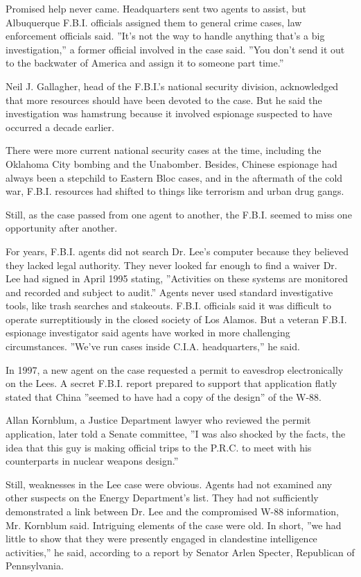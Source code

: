 Promised help never came. Headquarters sent two agents to assist, but
Albuquerque F.B.I. officials assigned them to general crime cases, law
enforcement officials said. ''It's not the way to handle anything that's
a big investigation,'' a former official involved in the case said.
''You don't send it out to the backwater of America and assign it to
someone part time.''

Neil J. Gallagher, head of the F.B.I.'s national security division,
acknowledged that more resources should have been devoted to the case.
But he said the investigation was hamstrung because it involved
espionage suspected to have occurred a decade earlier.

There were more current national security cases at the time, including
the Oklahoma City bombing and the Unabomber. Besides, Chinese espionage
had always been a stepchild to Eastern Bloc cases, and in the aftermath
of the cold war, F.B.I. resources had shifted to things like terrorism
and urban drug gangs.

Still, as the case passed from one agent to another, the F.B.I. seemed
to miss one opportunity after another.

For years, F.B.I. agents did not search Dr. Lee's computer because they
believed they lacked legal authority. They never looked far enough to
find a waiver Dr. Lee had signed in April 1995 stating, ''Activities on
these systems are monitored and recorded and subject to audit.'' Agents
never used standard investigative tools, like trash searches and
stakeouts. F.B.I. officials said it was difficult to operate
surreptitiously in the closed society of Los Alamos. But a veteran
F.B.I. espionage investigator said agents have worked in more
challenging circumstances. ''We've run cases inside C.I.A.
headquarters,'' he said.

In 1997, a new agent on the case requested a permit to eavesdrop
electronically on the Lees. A secret F.B.I. report prepared to support
that application flatly stated that China ''seemed to have had a copy of
the design'' of the W-88.

Allan Kornblum, a Justice Department lawyer who reviewed the permit
application, later told a Senate committee, ''I was also shocked by the
facts, the idea that this guy is making official trips to the P.R.C. to
meet with his counterparts in nuclear weapons design.''

Still, weaknesses in the Lee case were obvious. Agents had not examined
any other suspects on the Energy Department's list. They had not
sufficiently demonstrated a link between Dr. Lee and the compromised
W-88 information, Mr. Kornblum said. Intriguing elements of the case
were old. In short, ''we had little to show that they were presently
engaged in clandestine intelligence activities,'' he said, according to
a report by Senator Arlen Specter, Republican of Pennsylvania.

